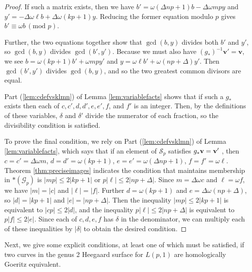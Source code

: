 \documentclass{amsart}     %
\theoremstyle{definition}
\begin{document}
\begin{proof}
If such a matrix exists, then we have $b' = \omega(\Delta np + 1)b - \Delta \omega m p y$ and $y ' = - \Delta \omega \ell b + \Delta \omega (kp + 1) y$. Reducing the former equation modulo $p$ gives $b' \equiv \omega b \, (\mbox{mod }p)$.



 Further, the two equations together show that $\gcd(b, y)$ divides both $b' $ and $y'$, so  $\gcd(b,y)$ divides $\gcd(b',y')$. Because we must also have $(g_*)^{-1} \textbf{v} ' = \textbf{v}$,  we see $b = \omega (kp+1) b' + \omega mp y'$ and $y = \omega\ell b' + \omega(np + \Delta) y'$. Then $\gcd(b',y')$ divides $\gcd (b,y)$, and so the two greatest common divisors are equal.




Part (\ref{lem:cdefvsklmn}) of Lemma \ref{lem:variablefacts} shows that if such a $g_*$ exists then each of $c, c', d,  d', e, e', f$, and $f'$ is an integer. Then, by the definitions of these variables, $\delta$ and $\delta'$ divide the numerator of each fraction, so the divisibility condition is satisfied.

To prove the final condition, we rely on Part (\ref{lem:cdefvsklmn}) of Lemma \ref{lem:variablefacts}, which says that if an element of $\mathcal S_p$ satisfies  $g_* \textbf v = \textbf v'$
, then $c=  c' = \Delta \omega m$, $d = d' = \omega (kp + 1)$, $e= e'  =\omega (\Delta np + 1)$, $f = f'  =  \omega \ell$. Theorem \ref{thm:preciseimages} indicates the condition that maintains membership in $*(\mathcal G_p)$ is $|mp | \leq 2|kp + 1|$ or $p| \ell |  \leq  2 | np + \Delta |$. Since $m = \Delta \omega c$ and $\ell = \omega f$, we have $|m| = |c|$ and $|\ell| = |f|$. Further $d =\omega( kp + 1)$ and $e = \Delta\omega (np + \Delta)$, so $|d| = |kp + 1|$ and $|e| = |np + \Delta |$. Then the inequality $|mp | \leq 2|kp + 1|$ is equivalent to $|cp | \leq 2|d| $, and the inequality $p| \ell |  \leq  2 | np + \Delta |$ is equivalent to $p| f |  \leq  2 | e |$. Since each of $c, d, e, f$ has $\delta$ in the denominator, we can multiply each of these inequalities by $|\delta|$ to obtain the desired condition.
\end{proof}

Next, we give some explicit conditions, at least one of which must be satisfied, if two curves in the genus 2 Heegaard surface for $L(p,1)$ are homologically Goeritz equivalent. 
\end{document}
